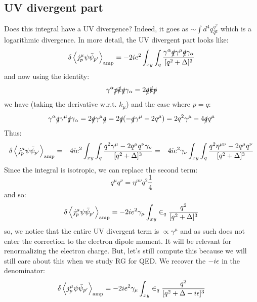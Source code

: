 \subsection{UV divergent part}
Does this integral have a UV divergence? Indeed, it goes as $\sim \int d^4q \frac{q^2}{q^6}$ which is a logarithmic divergence. In more detail, the UV divergent part looks like:
\begin{equation}
    \delta \left< j^\mu_p \psi \bar{\psi}_{p'} \right>_{\text{amp}} = -2ie^2\int_{xy}\int_q\frac{\gamma^\alpha \slashed{q}\gamma^\mu \slashed{q}\gamma_\alpha}{[q^2 + \Delta]^3}
\end{equation}
and now using the identity:
\begin{equation}
    \gamma^\alpha \slashed{p}\slashed{k}\slashed{q}\gamma_\alpha = 2\slashed{q}\slashed{k}\slashed{p}
\end{equation}
we have (taking the derivative w.r.t. $k_\mu$) and the case where $p = q$:
\begin{equation}
    \gamma^\alpha \slashed{q}\gamma^\mu \slashed{q}\gamma_\alpha = 2\slashed{q}\gamma^\mu \slashed{q} = 2\slashed{q}(-\slashed{q}\gamma^\mu - 2q^\mu) = 2q^2\gamma^\mu - 4\slashed{q}q^\mu
\end{equation}
Thus:
\begin{equation}
    \delta \left< j^\mu_p \psi \bar{\psi}_{p'} \right>_{\text{amp}} = -4ie^2\int_{xy}\int_q\frac{q^2\gamma^\mu - 2q^\mu q^\nu \gamma_\nu}{[q^2 + \Delta]^3} = -4ie^2\gamma_\nu \int_{xy}\int_q\frac{q^2\eta^{\mu\nu} - 2q^\mu q^\nu}{[q^2 + \Delta]^3}
\end{equation}
Since the integral is isotropic, we can replace the second term:
\begin{equation}
    q^\mu q^\nu = \eta^{\mu\nu}q^2\frac{1}{4}
\end{equation}
and so:
\begin{equation}
    \delta \left< j^\mu_p \psi \bar{\psi}_{p'} \right>_{\text{amp}} = -2ie^2\gamma_\mu \int_{xy}\in_{q}\frac{q^2}{[q^2 + \Delta]^3}
\end{equation}
so, we notice that the entire UV divergent term is $\propto \gamma^\mu$ and as such does not enter the correction to the electron dipole moment. It will be relevant for renormalizing the electron charge. But, let's still compute this because we will still care about this when we study RG for QED. We recover the $-i\epsilon$ in the denominator:
\begin{equation}
    \delta \left< j^\mu_p \psi \bar{\psi}_{p'} \right>_{\text{amp}} = -2ie^2\gamma_\mu \int_{xy}\in_{q}\frac{q^2}{[q^2 + \Delta-i\epsilon]^3}
\end{equation}
